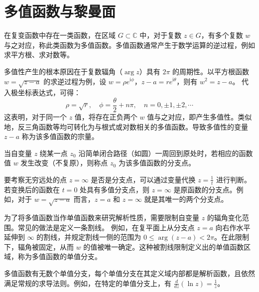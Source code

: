 \section{多值函数与黎曼面}

\begin{definition}[多值函数]
在复变函数中存在一类函数，在区域 \(G \subset \mathbb{C}\) 中，对于复数 \(z \in G\)，有多个复数 \(w\) 与之对应，称此类函数为多值函数。多值函数通常产生于数学运算的逆过程，例如求平方根、求对数等。
\end{definition}

\begin{remark}[多值性的数学根源]
多值性产生的根本原因在于复数辐角（\(\arg z\)）具有 \(2\pi\) 的周期性。以平方根函数 \(w = \sqrt{z-a}\) 的求逆过程为例，设 \(w = \rho e^{\mathrm{i}\phi}\)，\(z-a = r e^{\mathrm{i}\theta}\)，则有 \(w^2 = z-a\)。
代入极坐标表达式，可得：
\[
\rho = \sqrt{r}, \quad \phi = \frac{\theta}{2} + n\pi, \quad n = 0, \pm 1, \pm 2, \cdots
\]
这表明，对于同一个 \(z\) 值，将存在正负两个 \(w\) 值与之对应，即产生多值性。类似地，反三角函数等均可转化为与根式或对数相关的多值函数。导致多值性的变量 \(z-a\) 称为该多值函数的宗量。
\end{remark}


\begin{definition}[分支点]
当自变量 \(z\) 绕某一点 \(z_0\) 沿简单闭合路径（如圆）一周回到原处时，若相应的函数值 \(w\) 发生改变（不复原），则称点 \(z_0\) 为该多值函数的分支点。
\end{definition}

\begin{remark}[分支点的判定方法]
要考察无穷远处的点 \(z = \infty\) 是否是分支点，可以通过变量代换 \(z = \frac{1}{t}\) 进行判断。若变换后的函数在 \(t = 0\) 处具有多值分支点，则 \(z = \infty\) 是原函数的分支点。例如，对于 \(w = \sqrt{z-a}\) 而言，\(z = a\) 和 \(z = \infty\) 就是其唯一的两个分支点。
\end{remark}

\begin{definition}[割线与单值分支]
为了将多值函数当作单值函数来研究解析性质，需要限制自变量 \(z\) 的辐角变化范围。常见的做法是定义一条割线。
例如，在复平面上从分支点 \(z=a\) 向右作水平延伸到 \(\infty\) 的割线，并规定割线一侧的范围为 \(0 \le \arg(z-a) < 2\pi\)。在此限制下，辐角被固定，从而 \(w\) 的值被唯一确定。这种被割线限制定义出的单值函数区域，称为多值函数的单值分支。
\end{definition}

\begin{remark}
多值函数有无数个单值分支，每个单值分支在其定义域内部都是解析函数，且依然满足常规的求导法则。例如，在特定的单值分支上，有 \(\frac{d}{dz}(\ln z) = \frac{1}{z}\)。
\end{remark}


